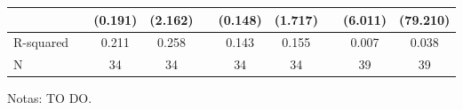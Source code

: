 \begin{table}[h]
{{\begin{threeparttable}
\begin{tabular}{l*{9}{S}}
					&&     (0.191)         &     (2.162)         &&     (0.148)         &     (1.717)         &&     (6.011)         &    (79.210)         \\
					\midrule            
					R-squared           &&       0.211         &       0.258         &&       0.143         &       0.155         &&       0.007         &       0.038         \\
					N                   &&          34         &          34         &&          34         &          34         &&          39         &          39         \\
					\hline \hline
				\end{tabular}
				\begin{tablenotes}
					\footnotesize{Notas: TO DO.}
				\end{tablenotes}
			\end{threeparttable}
		}
	}
\end{table}

